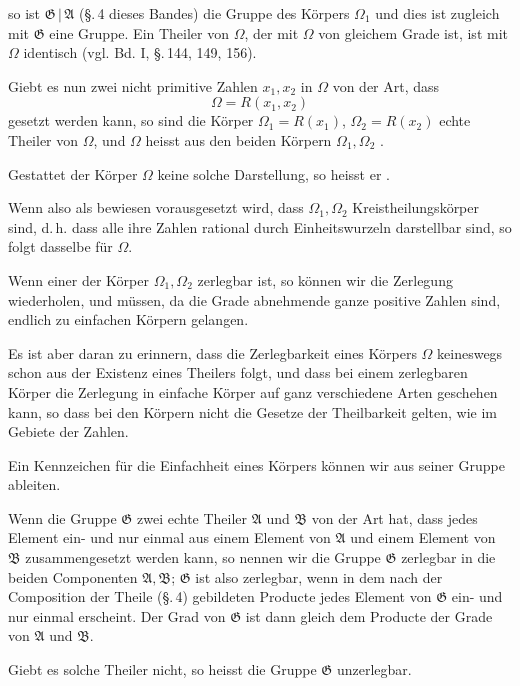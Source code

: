 so ist $\mathfrak{G}\,|\,\mathfrak{A}$ (\S.\,4 dieses Bandes) die Gruppe des Körpers $\Omega_1$ und
dies ist zugleich mit $\mathfrak{G}$ eine  Gruppe. Ein Theiler
von $\Omega$, der mit $\Omega$ von gleichem Grade ist, ist mit $\Omega$ identisch
(vgl. Bd. I, \S.\,144, 149, 156).

Giebt es nun zwei nicht primitive Zahlen $x_1, x_2$ in $\Omega$ von
der Art, dass
\[
\Omega = R(x_1, x_2)
\]
gesetzt werden kann, so sind die Körper $\Omega_1 = R(x_1)$, $\Omega_2 = R(x_2)$
echte Theiler von $\Omega$, und $\Omega$ heisst aus den beiden Körpern
$\Omega_1, \Omega_2$ .

Gestattet der Körper $\Omega$ keine solche Darstellung, so heisst
er .

Wenn also als bewiesen vorausgesetzt wird, dass $\Omega_1, \Omega_2$
Kreistheilungskörper sind, d.\,h. dass alle ihre Zahlen rational
durch Einheitswurzeln darstellbar sind, so folgt dasselbe für $\Omega$.

Wenn einer der Körper $\Omega_1, \Omega_2$ zerlegbar ist, so können
wir die Zerlegung wiederholen, und müssen, da die Grade abnehmende
 ganze positive Zahlen sind, endlich zu einfachen Körpern
 gelangen.


Es ist aber daran zu erinnern, dass die Zerlegbarkeit eines
Körpers $\Omega$ keineswegs schon aus der Existenz eines Theilers
folgt, und dass bei einem zerlegbaren Körper die Zerlegung in
einfache Körper auf ganz verschiedene Arten geschehen kann, so
dass bei den Körpern nicht die Gesetze der Theilbarkeit gelten,
wie im Gebiete der Zahlen.

Ein Kennzeichen für die Einfachheit eines Körpers können
wir aus seiner Gruppe ableiten.

Wenn die Gruppe $\mathfrak{G}$ zwei echte Theiler $\mathfrak{A}$ und $\mathfrak{B}$ von der
Art hat, dass jedes Element ein- und nur einmal aus einem Element
 von $\mathfrak{A}$ und einem Element von $\mathfrak{B}$ zusammengesetzt werden
kann, so nennen wir die Gruppe $\mathfrak{G}$ zerlegbar in die beiden
Componenten $\mathfrak{A}, \mathfrak{B}$; $\mathfrak{G}$ ist also zerlegbar, wenn in dem nach der
Composition der Theile (\S.\,4) gebildeten Producte
jedes Element von $\mathfrak{G}$ ein- und nur einmal erscheint. Der Grad
von $\mathfrak{G}$ ist dann gleich dem Producte der Grade von $\mathfrak{A}$ und $\mathfrak{B}$.

Giebt es solche Theiler nicht, so heisst die Gruppe $\mathfrak{G}$
unzerlegbar.
